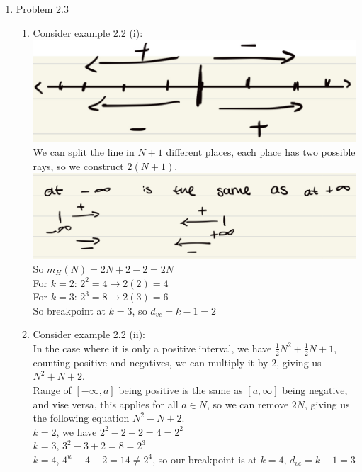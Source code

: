 \documentclass{article}
\begin{document}
\begin{enumerate}
        \item Problem 2.3
        \begin{enumerate}
            \item Consider example 2.2 (i):\\
            \includegraphics[scale=0.25]{img/2_3_1.jpeg}\\
            We can split the line in $N+1$ different places, each place has two possible rays, so we construct $2(N+1)$.\\
            \includegraphics[scale=0.15]{img/2_3_2.jpeg}\\
            So $m_H(N) = 2N + 2 - 2 = 2N$\\
            For $k = 2$: $2^2 = 4 \rightarrow 2(2) = 4$\\
            For $k = 3$: $2^3 = 8 \rightarrow 2(3) = 6$\\
            So breakpoint at $k = 3$, so $d_{vc} = k - 1 = 2$

            \item Consider example 2.2 (ii):\\
            In the case where it is only a positive interval, we have $\frac{1}{2}N^2 + \frac{1}{2}N + 1$, counting positive and negatives, we can multiply it by 2, giving us $N^2 + N + 2$.\\
            Range of $[-\infty, a]$ being positive is the same as $[a, \infty]$ being negative, and vise versa, this applies for all $a \in N$, so we can remove $2N$, giving us the following equation $N^2 - N + 2$.\\
            $k = 2$, we have $2^2-2+2=4=2^2$\\
            $k = 3$, $3^2-3+2=8=2^3$\\
            $k = 4$, $4^w-4+2=14\neq 2^4$, so our breakpoint is at $k = 4$, $d_{vc} = k - 1 = 3$


\end{enumerate}
\end{enumerate}
\end{document}
